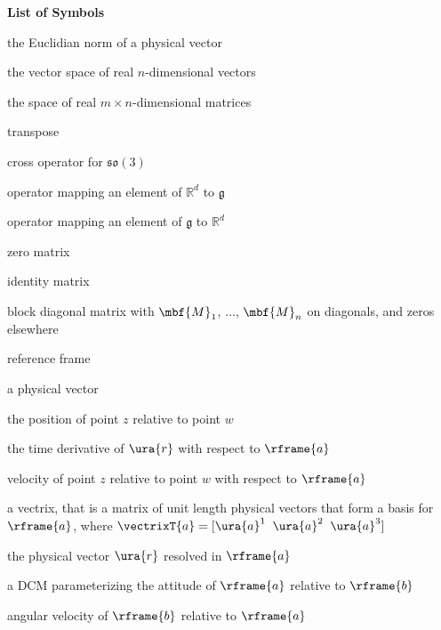   \centerline{\large\bf List of Symbols}
 \vspace{0.7in}


\begin{description}[style=multiline,leftmargin=4.5cm,labelindent=0.25in]	

\item[$\norm{\cdot}$] the Euclidian norm of a physical vector	

\item[$\mathbb{R}^n$]  the vector space of real $n$-dimensional vectors

\item[$\mathbb{R}^{m \times n}$]  the space of real $m\times n$-dimensional matrices

\item[$(\cdot)^\trans$]  transpose

\item[$(\cdot)^\times$]  cross operator for $\mathfrak{so}(3)$

\item[$(\cdot)^\wedge$] operator mapping an element of $\mathbb{R}^d$ to $\mathfrak{g}$

\item[$(\cdot)^\vee$]  operator mapping an element of  $\mathfrak{g}$ to $\mathbb{R}^d$

\item[$\mbf{0}$]  zero matrix

\item[$\mbf{1}$]  identity matrix

\item[$\diag{\mbf{M}_1,\dots,\mbf{M}_n}$] block diagonal matrix with $\mbf{M}_1$, $\dots$, $\mbf{M}_n$ on diagonals, and zeros elsewhere


\item[$\rframe{i}$] reference frame

\item[$\ura{r}$] a physical vector

\item[$\ura{r}^{z w}$] the position of point $z$ relative to point $w$

\item[$\ura{r}^{\fdot a}$] the time derivative of $\ura{r}$ with respect to $\rframe{a}$


\item[$\ura{r}^{zw^{\fdot a}} = \ura{v}^{zw/a}$] velocity of point $z$ relative to point $w$ with respect to $\rframe{a}$


\item[$\vectrix{a}$] a vectrix, that is a matrix of unit length physical vectors that form a basis for $\rframe{a}$, where $\vectrixT{a} = [\ura{a}^1 \;\; \ura{a}^2 \;\; \ura{a}^3]$

\item[$\mbf{r}_a$] the physical vector $\ura{r}$ resolved in $\rframe{a}$

\item[$\mbf{C}_{ab}$] a DCM parameterizing the attitude of $\rframe{a}$ relative to $\rframe{b}$

\item[$\ura{\omega}^{ba}$] angular velocity of $\rframe{b}$ relative to $\rframe{a}$


\end{description}
